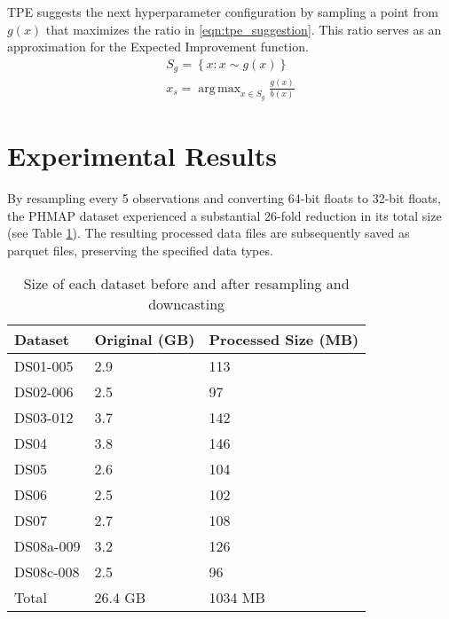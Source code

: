 \documentclass{IEEEtran}
\DeclareMathOperator*{\argmax}{arg\,max}
\begin{document}
            TPE suggests the next hyperparameter configuration by sampling a point from $g(x)$ that maximizes the ratio in \eqref{eqn:tpe_suggestion}. This ratio serves as an approximation for the Expected Improvement function.
            \begin{equation} \label{eqn:tpe_suggestion}
                \begin{gathered}
                    S_g = \left\{x: x \sim g(x)\right\} \\
                    x_s = \argmax_{x \in S_g} \frac{g(x)}{b(x)}
                \end{gathered}
            \end{equation}

    \section{Experimental Results} \label{sec:results}

        By resampling every 5 observations and converting 64-bit floats to 32-bit floats, the PHMAP dataset experienced a substantial 26-fold reduction in its total size (see Table \ref{tab:processed_sizes}). The resulting processed data files are subsequently saved as parquet files, preserving the specified data types.
        \begin{table}[!htbp]
            \caption{Size of each dataset before and after resampling and downcasting}
            \label{tab:processed_sizes}
            \centering
            \begin{tabular}{lll}
                \toprule
                Dataset & Original (GB) & Processed Size (MB) \\
                \midrule
                DS01-005 & 2.9 & 113 \\
                DS02-006 & 2.5 & 97 \\
                DS03-012 & 3.7 & 142 \\
                DS04 & 3.8 & 146 \\
                DS05 & 2.6 & 104 \\
                DS06 & 2.5 & 102 \\
                DS07 & 2.7 & 108 \\
                DS08a-009 & 3.2 & 126 \\
                DS08c-008 & 2.5 & 96 \\
                \midrule
                Total & 26.4 GB & 1034 MB \\
                \bottomrule
            \end{tabular}
        \end{table}
\end{document}
